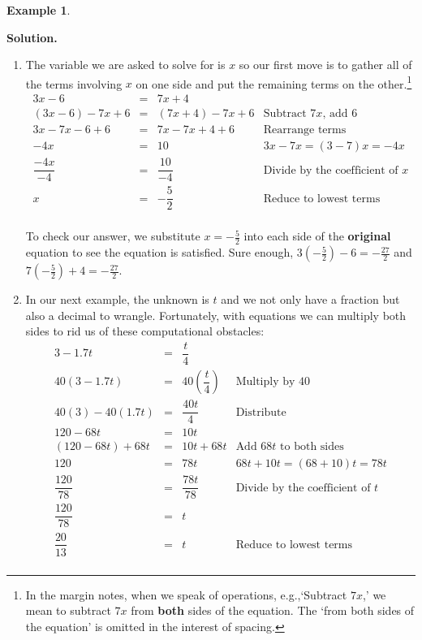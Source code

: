 \documentclass[11pt]{article}
\theoremstyle{definition}  %
\newtheorem{ex}{\bf Example}[section]
\begin{document}
\begin{ex}
\begin{multicols}{2}
\end{multicols}

{\bf Solution.} 

\begin{enumerate}

\item  The variable we are asked to solve for is $x$ so our first move is to gather all of the terms involving $x$ on one side and put the remaining terms on the other.\footnote{In the margin notes, when we speak of operations, e.g.,`Subtract $7x$,' we mean to subtract $7x$ from \textbf{both} sides of the equation.  The `from both sides of the equation' is omitted in the interest of spacing.}\[ \begin{array}{rclr} 3x - 6 &  = & 7x + 4 & \\
                       (3x-6) - 7x + 6 &  = & (7x+4) -7x +6 &  \text{Subtract $7x$, add $6$} \\
											3x - 7x - 6 + 6 & = & 7x - 7x + 4 + 6 & \text{Rearrange terms} \\
											-4x & = & 10 & \text{$3x-7x = (3-7)x = -4x$} \\ [5pt]
											\dfrac{-4x}{-4} & = & \dfrac{10}{-4} & \text{Divide by the coefficient of $x$} \\ [10pt]
											x & = & -\dfrac{5}{2} & \text{Reduce to lowest terms} \\ \end{array}\]
											
To check our answer, we substitute $x = -\frac{5}{2}$ into each side of the \textbf{original} equation to see the equation is satisfied.  Sure enough, $3\left(-\frac{5}{2}\right) - 6 = -\frac{27}{2}$ and $7\left(-\frac{5}{2}\right) + 4 = -\frac{27}{2}$.

\item  In our next example, the unknown is $t$ and we not only have a fraction but also a decimal to wrangle.  Fortunately, with equations we can multiply both sides to rid us of  these computational obstacles:\[ \begin{array}{rclr}  3 - 1.7t  & = &  \dfrac{t}{4} & \\ [5pt]
                       40(3 - 1.7t)  & = &  40 \left(\dfrac{t}{4}\right) & \text{Multiply by $40$} \\[5pt]
											40(3) - 40(1.7t)  & = &  \dfrac{40 t}{4} & \text{Distribute} \\
											120 - 68t & = & 10 t & \\
											(120 -68t) + 68 t & = & 10t + 68 t & \text{Add $68t$ to both sides} \\
											120 & = & 78 t & \text{$68t + 10t = (68 + 10)t = 78 t$}\\
											\dfrac{120}{78} & = & \dfrac{78t}{78} &  \text{Divide by the coefficient of $t$}\\[8pt]
											\dfrac{120}{78} & = & t & \\ [8pt]
											\dfrac{20}{13} & = & t & \text{Reduce to lowest terms} \\ \end{array}\]
											

\end{enumerate}
\end{ex}
\end{document}
